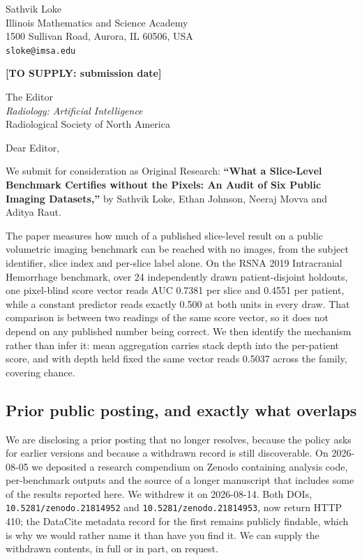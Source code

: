 \documentclass[11pt,letterpaper]{article}
\newcommand{\todo}[1]{\textbf{[TO SUPPLY: #1]}}
\begin{document}
\noindent
Sathvik Loke\\
Illinois Mathematics and Science Academy\\
1500 Sullivan Road, Aurora, IL 60506, USA\\
\texttt{sloke@imsa.edu}

\vspace{0.8em}
\noindent \todo{submission date}

\vspace{0.8em}
\noindent
The Editor\\
\emph{Radiology: Artificial Intelligence}\\
Radiological Society of North America

\vspace{0.8em}
\noindent Dear Editor,

We submit for consideration as Original Research: \textbf{``What a Slice-Level
Benchmark Certifies without the Pixels: An Audit of Six Public Imaging
Datasets,''} by Sathvik Loke, Ethan Johnson, Neeraj Movva and Aditya Raut.

The paper measures how much of a published slice-level result on a public
volumetric imaging benchmark can be reached with no images, from the subject
identifier, slice index and per-slice label alone. On the RSNA 2019 Intracranial
Hemorrhage benchmark, over 24 independently drawn patient-disjoint holdouts, one
pixel-blind score vector reads AUC 0.7381 per slice and 0.4551 per patient, while
a constant predictor reads exactly 0.500 at both units in every draw. That
comparison is between two readings of the same score vector, so it does not
depend on any published number being correct. We then identify the mechanism
rather than infer it: mean aggregation carries stack depth into the per-patient
score, and with depth held fixed the same vector reads 0.5037 across the family,
covering chance.

\subsection*{Prior public posting, and exactly what overlaps}

We are disclosing a prior posting that no longer resolves, because the policy
asks for earlier versions and because a withdrawn record is still discoverable.
On 2026-08-05 we deposited a research compendium on Zenodo containing analysis
code, per-benchmark outputs and the source of a longer manuscript that includes
some of the results reported here. We withdrew it on 2026-08-14. Both DOIs,
\texttt{10.5281/zenodo.21814952} and \texttt{10.5281/zenodo.21814953}, now return
HTTP 410; the DataCite metadata record for the first remains publicly findable,
which is why we would rather name it than have you find it. We can supply the
withdrawn contents, in full or in part, on request.
\end{document}
